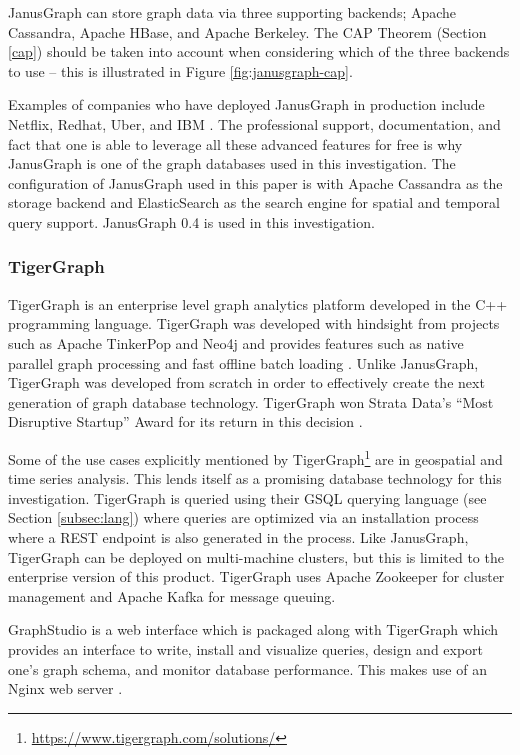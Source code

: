 JanusGraph can store graph data via three supporting backends; Apache Cassandra, Apache HBase, and Apache Berkeley. The CAP Theorem (Section \ref{cap}) should be taken into account when considering which of the three backends to use -- this is illustrated in Figure \ref{fig:janusgraph-cap}.

Examples of companies who have deployed JanusGraph in production include Netflix, Redhat, Uber, and IBM \cite{janusgraph-readme}. The professional support, documentation, and fact that one is able to leverage all these advanced features for free is why JanusGraph is one of the graph databases used in this investigation. The configuration of JanusGraph used in this paper is with Apache Cassandra as the storage backend and ElasticSearch as the search engine for spatial and temporal query support. JanusGraph 0.4 is used in this investigation.

\subsubsection{TigerGraph}

TigerGraph is an enterprise level graph analytics platform developed in the C++ programming language. TigerGraph was developed with hindsight from projects such as Apache TinkerPop and Neo4j and provides features such as native parallel graph processing and fast offline batch loading \cite{tigergraph-benchmark} \cite{conference-trip}. Unlike JanusGraph, TigerGraph was developed from scratch in order to effectively create the next generation of graph database technology. TigerGraph won Strata Data’s ``Most Disruptive Startup'' Award for its return in this decision \cite{tigergraph-award}.

Some of the use cases explicitly mentioned by TigerGraph\footnote{\url{https://www.tigergraph.com/solutions/}} are in geospatial and time series analysis. This lends itself as a promising database technology for this investigation. TigerGraph is queried using their GSQL querying language (see Section \ref{subsec:lang}) where queries are optimized via an installation process where a REST endpoint is also generated in the process. Like JanusGraph, TigerGraph can be deployed on multi-machine clusters, but this is limited to the enterprise version of this product. TigerGraph uses Apache Zookeeper for cluster management and Apache Kafka for message queuing.

GraphStudio is a web interface which is packaged along with TigerGraph which provides an interface to write, install and visualize queries, design and export one's graph schema, and monitor database performance. This makes use of an Nginx web server \cite{tigergraph-infoworld}.

